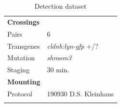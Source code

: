 \documentclass[11pt,singlespacinge,twoside]{reedthesis} %
\begin{document}
\begin{longtable}[]{@{}ll@{}}
\caption{\label{tab:detectdata} Detection dataset}\tabularnewline
\toprule
\endhead
\begin{minipage}[t]{0.21\columnwidth}\raggedright
\textbf{Crossings}\strut
\end{minipage} & \begin{minipage}[t]{0.73\columnwidth}\raggedright
\strut
\end{minipage}\tabularnewline
\begin{minipage}[t]{0.21\columnwidth}\raggedright
Pairs\strut
\end{minipage} & \begin{minipage}[t]{0.73\columnwidth}\raggedright
6\strut
\end{minipage}\tabularnewline
\begin{minipage}[t]{0.21\columnwidth}\raggedright
Transgenes\strut
\end{minipage} & \begin{minipage}[t]{0.73\columnwidth}\raggedright
\emph{cldnb:lyn-gfp} +/?\strut
\end{minipage}\tabularnewline
\begin{minipage}[t]{0.21\columnwidth}\raggedright
Mutation\strut
\end{minipage} & \begin{minipage}[t]{0.73\columnwidth}\raggedright
\emph{shroom3}\strut
\end{minipage}\tabularnewline
\begin{minipage}[t]{0.21\columnwidth}\raggedright
Staging\strut
\end{minipage} & \begin{minipage}[t]{0.73\columnwidth}\raggedright
30 min.\strut
\end{minipage}\tabularnewline
\begin{minipage}[t]{0.21\columnwidth}\raggedright
\textbf{Mounting}\strut
\end{minipage} & \begin{minipage}[t]{0.73\columnwidth}\raggedright
\strut
\end{minipage}\tabularnewline
\begin{minipage}[t]{0.21\columnwidth}\raggedright
Protocol\strut
\end{minipage} & \begin{minipage}[t]{0.73\columnwidth}\raggedright
190930 D.S. Kleinhans\strut
\end{minipage}\tabularnewline
\begin{minipage}[t]{0.21\columnwidth}\raggedright

\end{minipage}
\end{longtable}
\end{document}
